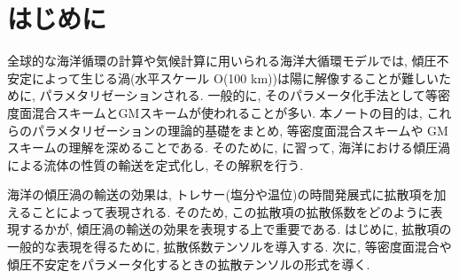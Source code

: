 \section{はじめに}
全球的な海洋循環の計算や気候計算に用いられる海洋大循環モデルでは, 傾圧不安定によって生じる渦(水平スケール O(100 km))は陽に解像することが難しいために, パラメタリゼーションされる. 
一般的に, そのパラメータ化手法として等密度面混合スキーム\citep{redi1982oceanic}とGMスキーム\citep{gent1990isopycnal}が使われることが多い. 
本ノートの目的は, これらのパラメタリゼーションの理論的基礎をまとめ, 等密度面混合スキームや GMスキームの理解を深めることである. 
そのために, \citet{vallis2006atmospheric}に習って, 海洋における傾圧渦による流体の性質の輸送を定式化し, 
その解釈を行う. 

海洋の傾圧渦の輸送の効果は, トレサー(塩分や温位)の時間発展式に拡散項を加えることによって表現される. 
そのため, この拡散項の拡散係数をどのように表現するかが, 傾圧渦の輸送の効果を表現する上で重要である. 
はじめに, 拡散項の一般的な表現を得るために, 拡散係数テンソルを導入する. 
次に, 等密度面混合や傾圧不安定をパラメータ化するときの拡散テンソルの形式を導く. 



